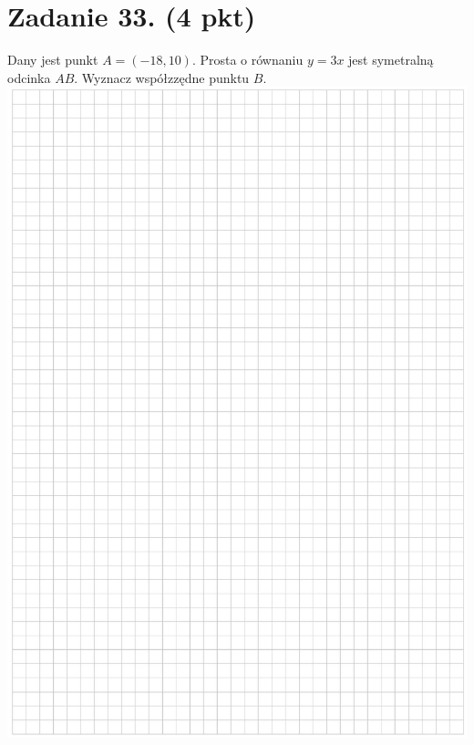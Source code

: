 \documentclass[10pt]{article}
\begin{document}
\section*{Zadanie 33. (4 pkt)}
Dany jest punkt \(A=(-18,10)\). Prosta o równaniu \(y=3 x\) jest symetralną odcinka \(A B\). Wyznacz współzzędne punktu \(B\).\\
\includegraphics[max width=\textwidth, center]{2024_11_21_d51d653f4fe4a5bb0c33g-22}\\
\end{document}
